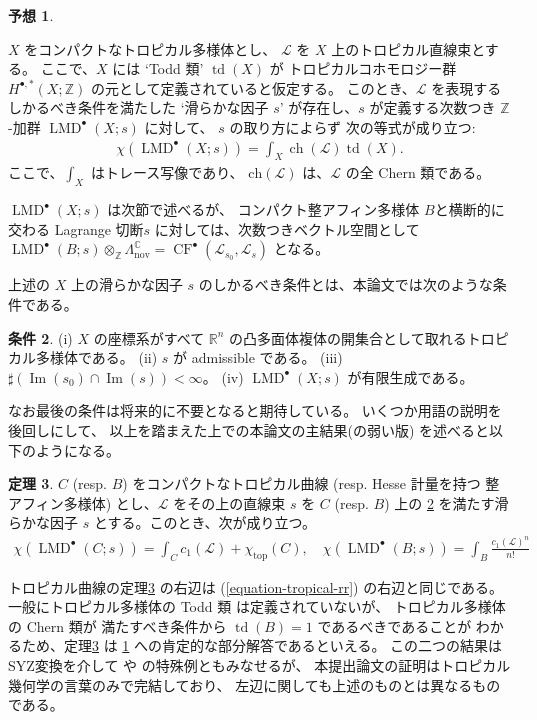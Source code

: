 \documentclass[a4paper,dvipdfmx,reqno,12pt]{amsart}
\theoremstyle{definition}
\newtheorem{theorem}{定理}[section]
\newtheorem{conjecture}[theorem]{予想}
\newtheorem{condition}[theorem]{条件}
\newcommand{\opn}[1]{\operatorname{#1}}
\numberwithin{equation}{section}
\begin{document}
\begin{conjecture} \label{conjecture-mirror-tropical-rr}

$X$ をコンパクトなトロピカル多様体とし、
$\mathcal{L}$ を $X$ 上のトロピカル直線束とする。
ここで、$X$ には `Todd 類' $\opn{td}(X)$ が
トロピカルコホモロジー群 $H^{\bullet,*}(X;\mathbb{Z})$
の元として定義されていると仮定する。
このとき、$\mathcal{L}$ を表現するしかるべき条件を満たした
`滑らかな因子 $s$' が存在し、$s$ が定義する次数つき
$\mathbb{Z}$-加群 $\opn{LMD}^{\bullet}(X;s)$ に対して、
$s$ の取り方によらず
次の等式が成り立つ:
\begin{align}
\chi(\opn{LMD}^{\bullet}(X;s))=\int_{X}\opn{ch}(\mathcal{L})\opn{td}(X).
\end{align}
ここで、$\int_X$ はトレース写像であり、
$\mathrm{ch}(\mathcal{L})$ は、$\mathcal{L}$ の全 Chern 類である。
\end{conjecture}
$\opn{LMD}^{\bullet}(X;s)$ は次節で述べるが、
コンパクト整アフィン多様体 $B$と横断的に交わる Lagrange 切断$s$
に対しては、次数つきベクトル空間として
$\opn{LMD}^{\bullet}(B;s)\otimes_{\mathbb{Z}}
\Lambda^{\mathbb{C}}_{\mathrm{nov}}=
\opn{CF}^{\bullet}(\mathscr{L}_{s_0},
\mathscr{L}_s)$ となる。

上述の $X$ 上の滑らかな因子 $s$ のしかるべき条件とは、本論文では次のような条件である。

\begin{condition} \label{condition-good}
(i) $X$ の座標系がすべて $\mathbb{R}^{n}$ 
の凸多面体複体の開集合として取れるトロピカル多様体である。
(ii) $s$ が admissible である。
(iii) $\sharp (\opn{Im}(s_0)\cap \opn{Im}(s))<\infty$。
(iv) $\opn{LMD}^{\bullet}(X;s)$ が有限生成である。
\end{condition}
なお最後の条件は将来的に不要となると期待している。
いくつか用語の説明を後回しにして、
以上を踏まえた上での本論文の主結果(の弱い版)
を述べると以下のようになる。

\begin{theorem} \label{theorem-main}
$C$ (resp. $B$) をコンパクトなトロピカル曲線 (resp. Hesse 計量を持つ
整アフィン多様体) とし、$\mathcal{L}$ をその上の直線束
$s$ を $C$ (resp. $B$) 上の
\cref{condition-good} を満たす滑らかな因子 $s$ 
とする。このとき、次が成り立つ。
\begin{align}
\chi(\opn{LMD}^{\bullet}(C;s))=\int_C c_1(\mathcal{L})+
\chi_{\opn{top}}(C), \quad
\chi(\opn{LMD}^{\bullet}(B;s))=\int_B \frac{c_1(\mathcal{L})^n}{n!}
\end{align}
\end{theorem}
トロピカル曲線の定理\ref{theorem-main} の右辺は
(\ref{equation-tropical-rr}) の右辺と同じである。
一般にトロピカル多様体の Todd 類 は定義されていないが、
トロピカル多様体の Chern 類が
満たすべき条件から $\opn{td}(B)=1$ であるべきであることが
わかるため、定理\ref{theorem-main} は
\cref{conjecture-mirror-tropical-rr}
への肯定的な部分解答であるといえる。
この二つの結果はSYZ変換を介して \cite{MR4301560} や 
\cite{auroux2022lagrangian} の特殊例ともみなせるが、
本提出論文の証明はトロピカル幾何学の言葉のみで完結しており、
左辺に関しても上述のものとは異なるものである。
\end{document}
